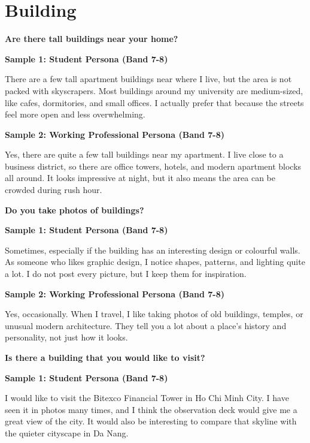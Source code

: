 \newpage

\section{Building}
\begin{ieltsquestion}
\textbf{Are there tall buildings near your home?}
\end{ieltsquestion}
\textbf{Sample 1: Student Persona (Band 7-8)}

There are a few tall apartment buildings near where I live, but the area is not packed with skyscrapers. Most buildings around my university are medium-sized, like cafes, dormitories, and small offices. I actually prefer that because the streets feel more open and less overwhelming.

\textbf{Sample 2: Working Professional Persona (Band 7-8)}

Yes, there are quite a few tall buildings near my apartment. I live close to a business district, so there are office towers, hotels, and modern apartment blocks all around. It looks impressive at night, but it also means the area can be crowded during rush hour.

\separator

\begin{ieltsquestion}
\textbf{Do you take photos of buildings?}
\end{ieltsquestion}
\textbf{Sample 1: Student Persona (Band 7-8)}

Sometimes, especially if the building has an interesting design or colourful walls. As someone who likes graphic design, I notice shapes, patterns, and lighting quite a lot. I do not post every picture, but I keep them for inspiration.

\textbf{Sample 2: Working Professional Persona (Band 7-8)}

Yes, occasionally. When I travel, I like taking photos of old buildings, temples, or unusual modern architecture. They tell you a lot about a place's history and personality, not just how it looks.

\separator

\begin{ieltsquestion}
\textbf{Is there a building that you would like to visit?}
\end{ieltsquestion}
\textbf{Sample 1: Student Persona (Band 7-8)}

I would like to visit the Bitexco Financial Tower in Ho Chi Minh City. I have seen it in photos many times, and I think the observation deck would give me a great view of the city. It would also be interesting to compare that skyline with the quieter cityscape in Da Nang.

